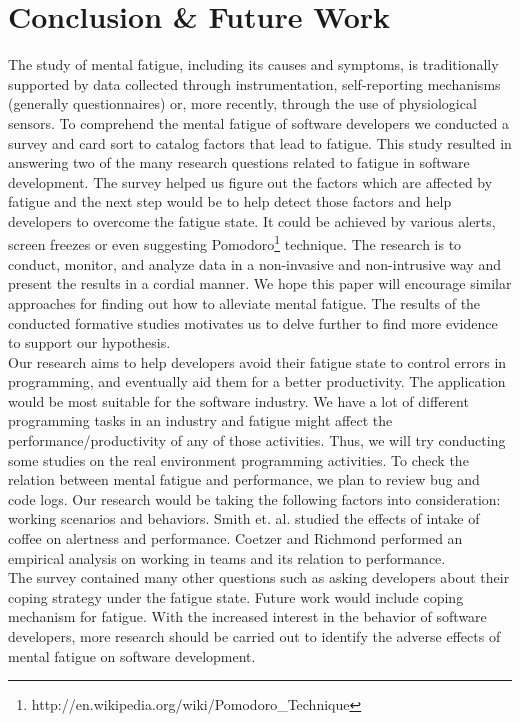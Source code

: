 \documentclass{acm_proc_article-sp}
\begin{document}
\section{Conclusion \& Future Work}
The study of mental fatigue, including its causes and symptoms, is traditionally
supported by data collected through instrumentation, self-reporting mechanisms
(generally questionnaires) or, more recently, through the use of physiological
sensors. To comprehend the mental fatigue of software developers we conducted a
survey and card sort to catalog factors that lead to fatigue. This study
resulted in answering two of the many research questions related to fatigue
in software development. The survey helped us figure out the factors which are
affected by fatigue and the next step would be to help detect those factors and
help developers to overcome the fatigue state. It could be achieved by various
alerts, screen freezes or even suggesting
Pomodoro\footnote{http://en.wikipedia.org/wiki/Pomodoro\_Technique} technique.
The research is to conduct, monitor, and analyze data in a non-invasive and
non-intrusive way and present the results in a cordial manner. We hope this
paper will encourage similar approaches for finding out how to alleviate mental
fatigue. The results of the conducted formative studies motivates us to delve
further to find more evidence to support our hypothesis.\\
Our research aims to help developers avoid their fatigue state to control
errors in programming, and eventually aid them for a better productivity. The
application would be most suitable for the software industry. We have a lot of
different programming tasks in an industry and fatigue might affect the
performance/productivity of any of those activities. Thus, we will try
conducting some studies on the real environment programming activities.
To check the relation between mental fatigue and performance, we plan to review
bug and code logs. Our research would be taking the following factors into
consideration: working scenarios and behaviors. Smith et. al.\cite{smith:coffee}
studied the effects of intake of coffee on alertness and performance. Coetzer
and Richmond \cite{richmond:team} performed an empirical analysis on working in
teams and its relation to performance.\\
The survey contained many other questions such as asking developers about their
coping strategy under the fatigue state. Future work would include coping
mechanism for fatigue. With the increased interest in the behavior of software
developers, more research should be carried out to identify the adverse effects
of mental fatigue on software development.
\end{document}
